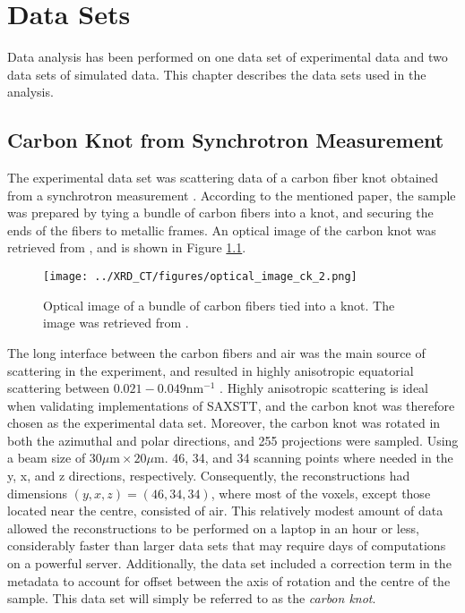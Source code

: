 \chapter{Data Sets} %
\label{ch:reconstruction_data_sets}

Data analysis has been performed on one data set of experimental data and two data sets of simulated data.
This chapter describes the data sets used in the analysis.

\section{Carbon Knot from Synchrotron Measurement} %
\label{sec:data_set_carbon_knot}
The experimental data set was scattering data of a carbon fiber knot obtained from a synchrotron measurement \cite{PMID_30821257}.
According to the mentioned paper, the sample was prepared by tying a bundle of carbon fibers into a knot, and securing the ends of the fibers to metallic frames.
An optical image of the carbon knot was retrieved from \cite{PMID_30821257}, and is shown in Figure \ref{fig:carbon_knot_image}.
\begin{figure}[htbp]
    \centering
    \texttt{[image: ../XRD\_CT/figures/optical\_image\_ck\_2.png]}
    \caption[Optical Image of Carbon Fiber Knot]{Optical image of a bundle of carbon fibers tied into a knot. The image was retrieved from \cite{PMID_30821257}.}
    \label{fig:carbon_knot_image}
\end{figure}
The long interface between the carbon fibers and air was the main source of scattering in the experiment, and resulted in highly anisotropic equatorial scattering between $0.021-0.049 \mathrm{nm}^{-1}$ \cite{PMID_30821257}.
Highly anisotropic scattering is ideal when validating implementations of SAXSTT, and the carbon knot was therefore chosen as the experimental data set.
Moreover, the carbon knot was rotated in both the azimuthal and polar directions, and 255 projections were sampled. Using a beam size of $30\mu\mathrm{m} \times 20\mu\mathrm{m}$.
46, 34, and 34 scanning points where needed in the y, x, and z directions, respectively.
Consequently, the reconstructions had dimensions $(y,x,z) = (46,34,34)$, where most of the voxels, except those located near the centre, consisted of air.
This relatively modest amount of data allowed the reconstructions to be performed on a laptop in an hour or less, considerably faster than larger data sets that may require days of computations on a powerful server.   %
Additionally, the data set included a correction term in the metadata to account for offset between the axis of rotation
and the centre of the sample. This data set will simply be referred to as the \emph{carbon knot}.


